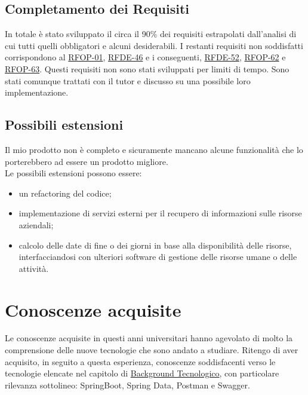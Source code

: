 \subsection{Completamento dei Requisiti}
In totale è stato sviluppato il circa il 90\% dei requisiti estrapolati dall'analisi di cui tutti quelli obbligatori e alcuni desiderabili. I restanti requisiti non soddisfatti corrispondono al \hyperlink{rf01}{RFOP-01}, \hyperlink{rf46}{RFDE-46} e i conseguenti, \hyperlink{rf52}{RFDE-52}, \hyperlink{rf62}{RFOP-62} e \hyperlink{rf63}{RFOP-63}. Questi requisiti non sono stati sviluppati per limiti di tempo. Sono stati comunque trattati con il tutor e discusso su una possibile loro implementazione.

\subsection{Possibili estensioni}
Il mio prodotto non è completo e sicuramente mancano alcune funzionalità che lo porterebbero ad essere un prodotto migliore.\\
Le possibili estensioni possono essere:
\begin{itemize}
\item un refactoring del codice;
\item implementazione di servizi esterni per il recupero di informazioni sulle risorse aziendali;
\item calcolo delle date di fine o dei giorni in base alla disponibilità delle risorse, interfacciandosi con ulteriori software di gestione delle risorse umane o delle attività.
\end{itemize} 

\section{Conoscenze acquisite}
Le conoscenze acquisite in questi anni universitari hanno agevolato di molto la comprensione delle nuove tecnologie che sono andato a studiare. Ritengo di aver acquisito, in seguito a questa esperienza, conoscenze soddisfacenti verso le tecnologie elencate nel capitolo di \hyperlink{tecnologie}{Background Tecnologico}, con particolare rilevanza sottolineo: SpringBoot, Spring Data, Postman e Swagger.

